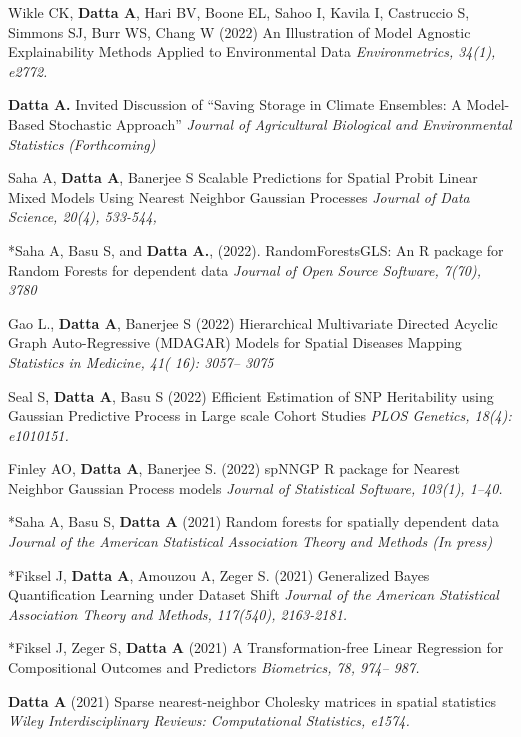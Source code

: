 \documentclass[12pt]{article}
\newcommand{\mine}{
  \addtocounter{enumi}{1}
\item[\fcolorbox{white}{grey}{\color{white} \tiny \arabic{enumi}}]
}
\begin{document}
\item Wikle CK, \textbf{Datta A}, Hari BV, Boone EL, Sahoo I, Kavila I, Castruccio S, Simmons SJ, Burr WS, Chang W (2022) {An Illustration of Model Agnostic Explainability Methods Applied to Environmental Data} {\it Environmetrics, 34(1), e2772.}

\mine \textbf{Datta A.} {Invited Discussion of ``Saving Storage in Climate Ensembles: A Model-Based Stochastic Approach''} {\it Journal of Agricultural Biological and Environmental Statistics} {\it (Forthcoming)}

\item *Saha A, \textbf{Datta A}, Banerjee S {Scalable Predictions for Spatial Probit Linear Mixed Models Using Nearest Neighbor Gaussian Processes} {\it Journal of Data Science, 20(4), 533-544,}

\mine *Saha A, Basu S, and \textbf{Datta A.}, (2022). {RandomForestsGLS: An R package for Random Forests for dependent data} {\it Journal of Open Source Software, 7(70), 3780}

\item Gao L., \textbf{Datta A}, Banerjee S (2022) {Hierarchical Multivariate Directed Acyclic Graph Auto-Regressive (MDAGAR) Models for Spatial Diseases Mapping} {\it Statistics in Medicine, 41( 16): 3057– 3075}

\item Seal S, \textbf{Datta A}, Basu S (2022) {Efficient Estimation of SNP Heritability using Gaussian Predictive Process in Large scale Cohort Studies} {\it PLOS Genetics, 18(4): e1010151.}

\item Finley AO, \textbf{Datta A}, Banerjee S. (2022) {spNNGP R package for Nearest Neighbor Gaussian Process models} {\it Journal of Statistical Software, 103(1), 1–40.}

\mine *Saha A, Basu S, \textbf{Datta A} (2021) {Random forests for spatially dependent data} {\it Journal of the American Statistical Association Theory and Methods (In press)}

\mine *Fiksel J, \textbf{Datta A}, Amouzou A, Zeger S. (2021) {Generalized Bayes Quantification Learning under Dataset Shift } {\it  Journal of the American Statistical Association Theory and Methods, 117(540), 2163-2181.}

\mine *Fiksel J, Zeger S, \textbf{Datta A} (2021) {A Transformation-free Linear Regression for Compositional Outcomes and Predictors} {\it Biometrics, 78, 974– 987.}

\mine \textbf{Datta A} (2021) {Sparse nearest-neighbor Cholesky matrices in spatial statistics} {\it  Wiley Interdisciplinary Reviews: Computational
	Statistics, e1574.}
\end{document}

